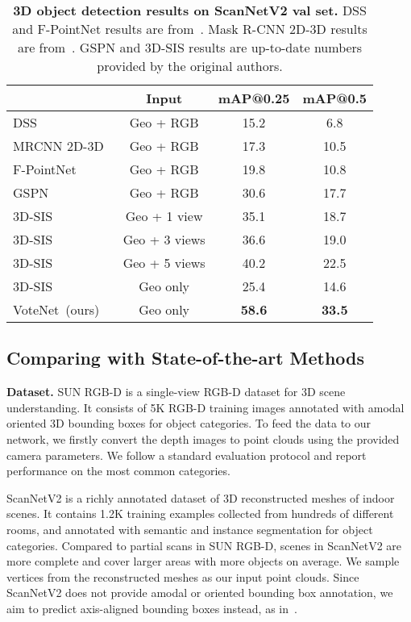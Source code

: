 \documentclass[10pt,twocolumn,letterpaper]{article}
\newcommand\votenet{VoteNet}
\begin{document}
\begin{table}[t!]
\small
\setlength{\tabcolsep}{3.2pt}
\begin{center}
\begin{tabular}{l |c| c c}
\toprule
    & Input & mAP@0.25 & mAP@0.5 \\ \hline    
    DSS~\cite{song2016deep,hou20183d} & Geo + RGB & 15.2 & 6.8  \\
    MRCNN 2D-3D~\cite{he2017mask,hou20183d} & Geo + RGB & 17.3 & 10.5 \\
    F-PointNet~\cite{qi2018frustum,hou20183d} & Geo + RGB & 19.8 & 10.8 \\
    GSPN~\cite{yi2018gspn} & Geo + RGB & 30.6 & 17.7 \\ \midrule
    3D-SIS \cite{hou20183d} & Geo + 1 view & 35.1 & 18.7 \\ 
    3D-SIS \cite{hou20183d} & Geo + 3 views & 36.6 & 19.0 \\
    3D-SIS \cite{hou20183d} & Geo + 5 views & 40.2 & 22.5 \\ \midrule
    3D-SIS \cite{hou20183d} & Geo only & 25.4 & 14.6 \\
\votenet~(ours) & Geo only & \textbf{58.6} & \textbf{33.5} \\ \bottomrule 
\end{tabular}
\end{center}
\caption{\small \textbf{3D object detection results on ScanNetV2 val set.} DSS and F-PointNet results are from~\cite{hou20183d}. Mask R-CNN 2D-3D results are from~\cite{yi2018gspn}. GSPN and 3D-SIS results are up-to-date numbers provided by the original authors.
}
\label{tab:scannet}
\end{table}

\subsection{Comparing with State-of-the-art Methods}
\label{sec:exp:sota}




\noindent\textbf{Dataset.}
SUN RGB-D \cite{song2015sun} is a single-view RGB-D dataset for 3D scene understanding. It consists of 5K RGB-D training images annotated with amodal oriented 3D bounding boxes for  object categories. To feed the data to our network, we firstly convert the depth images to point clouds using the provided camera parameters. We follow a standard evaluation protocol and report performance on the  most common categories.


ScanNetV2 \cite{dai2017scannet} is a richly annotated dataset of 3D reconstructed meshes of indoor scenes. It contains 1.2K training examples collected from hundreds of different rooms, and annotated with semantic and instance segmentation for  object categories. Compared to partial scans in SUN RGB-D, scenes in ScanNetV2 are more complete and cover larger areas with more objects on average.
We sample vertices from the reconstructed meshes as our input point clouds.  Since ScanNetV2 does not provide amodal or oriented bounding box annotation, we aim to predict axis-aligned bounding boxes instead, as in~\cite{hou20183d}.
\end{document}
